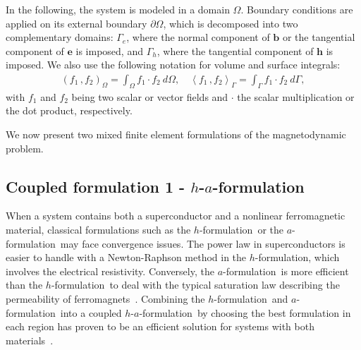 \documentclass[journal]{IEEEtran}
\renewcommand{\vec}[1]{\boldsymbol{#1}} %
\newcommand{\paren}[1]{\left(#1\right)}
\newcommand{\parenangle}[1]{\left\langle#1\right\rangle}
\newcommand{\volInt}[3]{\paren{#1 \, , #2}_{#3}}
\newcommand{\surInt}[3]{\parenangle{#1 \, , #2}_{#3}}
\renewcommand{\b}{\vec b}
\newcommand{\h}{\vec h}
\newcommand{\e}{\vec e}
\renewcommand{\O}{\Omega}
\newcommand{\af}{$a$-formulation\ }
\newcommand{\hf}{$h$-formulation\ }
\newcommand{\haf}{$h$-$a$-formulation\ }
\newcommand{\afOnly}{$a$-formulation}
\newcommand{\hfOnly}{$h$-formulation}
\begin{document}
In the following, the system is modeled in a domain $\O$. Boundary conditions are applied on its external boundary $\partial \O$, which is decomposed into two complementary domains: $\Gamma_e$, where the normal component of $\b$ or the tangential component of $\e$ is imposed, and $\Gamma_h$, where the tangential component of $\h$ is imposed. We also use the following notation for volume and surface integrals:
\begin{align}
\volInt{f_1}{f_2}{\Omega} = \int_{\Omega} f_1 \cdot f_2 \ d\Omega, \quad  \surInt{f_1}{f_2}{\Gamma} = \int_{\Gamma} f_1 \cdot f_2 \ d\Gamma,
\end{align}
with $f_1$ and $f_2$ being two scalar or vector fields and $\cdot$ the scalar multiplication or the dot product, respectively.

We now present two mixed finite element formulations of the magnetodynamic problem. %


\subsection{Coupled formulation 1 - \haf}

When a system contains both a superconductor and a nonlinear ferromagnetic material, classical formulations such as the \hf or the \af may face convergence issues. The power law in superconductors is easier to handle with a Newton-Raphson method in the \hfOnly, which involves the electrical resistivity. %
Conversely, the \af is more efficient than the \hf to deal with the typical saturation law describing the permeability of ferromagnets~\cite{dular2019finite}. Combining the \hf and \af into a coupled \haf by choosing the best formulation in each region has proven to be an efficient solution for systems with both materials~\cite{dular2019finite}.
\end{document}
